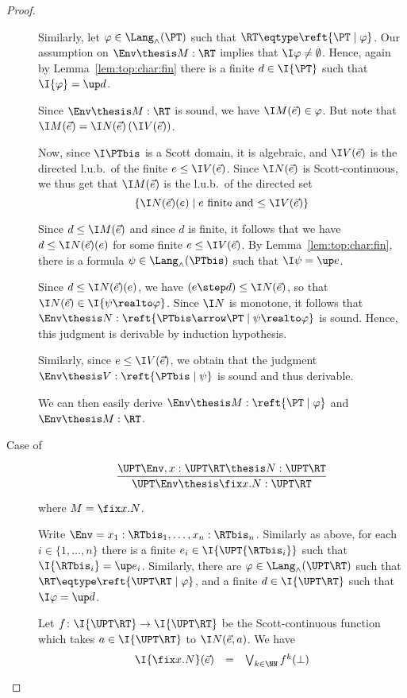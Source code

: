 \begin{proof}
\begin{description}
Similarly, let $\varphi \in \Lang_\land(\PT)$
such that $\RT \eqtype \reft{\PT \mid \varphi}$.
Our assumption on $\Env \thesis M : \RT$
implies that $\I\varphi \neq \emptyset$.
Hence, again by Lemma~\ref{lem:top:char:fin}
there is a finite $d \in \I{\PT}$
such that $\I{\varphi} = \up d$.


Since $\Env \thesis M : \RT$ is sound,
we have
$\I M(\vec e) \in \varphi$.
But note that
$\I M(\vec e) = \I N(\vec e)\left(\I V(\vec e) \right)$.

Now, since $\I\PTbis$ is a Scott domain, it is algebraic,
and $\I V(\vec e)$ is the directed l.u.b.\ of the finite $e \leq \I V(\vec e)$.
Since $\I N(\vec e)$ is Scott-continuous, we thus get
that $\I M(\vec e)$ is the l.u.b.\ of the directed set
\[
\left\{
  \I N(\vec e)(e)
  \mid
  \text{$e$ finite and $\leq \I V(\vec e)$}
\right\}
\]

\noindent
Since $d \leq \I M(\vec e)$ and since $d$ is finite,
it follows that we have
$d \leq \I N(\vec e)(e)$ for some finite $e \leq \I V(\vec e)$.
By Lemma~\ref{lem:top:char:fin},
there is a formula $\psi \in \Lang_\land(\PTbis)$
such that $\I\psi = \up e$.

Since $d \leq \I N(\vec e)(e)$, we have
$(e \step d) \leq \I N(\vec e)$,
so that
$\I N(\vec e) \in \I{\psi \realto \varphi}$.
Since $\I N$ is monotone, it follows that 
$\Env \thesis N : \reft{\PTbis \arrow \PT \mid \psi \realto \varphi}$
is sound.
Hence, this judgment is derivable by induction hypothesis.

Similarly, since $e \leq \I V(\vec e)$,
we obtain that the judgment
$\Env \thesis V : \reft{\PTbis \mid \psi}$
is sound and thus derivable.

We can then easily derive $\Env \thesis M : \reft{\PT \mid \varphi}$
and $\Env \thesis M : \RT$.

\item[Case of]
\[
\dfrac{\UPT\Env,x:\UPT\RT \thesis N : \UPT\RT}
  {\UPT\Env \thesis \fix x.N : \UPT\RT}
\]

\noindent
where $M = \fix x.N$.

Write $\Env = x_1:\RTbis_1,\dots,x_n:\RTbis_n$.
Similarly as above, for each $i \in \{1,\dots,n\}$
there is a finite $e_i \in \I{\UPT{\RTbis_i}}$
such that $\I{\RTbis_i} = \up e_i$.
Similarly, there are $\varphi \in \Lang_\land(\UPT\RT)$
such that $\RT \eqtype \reft{\UPT\RT \mid \varphi}$,
and a finite $d \in \I{\UPT\RT}$ such that $\I\varphi = \up d$.

Let $f \colon \I{\UPT\RT} \to \I{\UPT\RT}$
be the Scott-continuous function which takes
$a \in \I{\UPT\RT}$ to $\I N(\vec e,a)$.
We have
\[
\begin{array}{l l l}
  \I{\fix x.N}(\vec e)
& =
& \bigvee_{k \in \NN}
  f^k(\bot)
\end{array}
\]


\end{description}
\end{proof}
